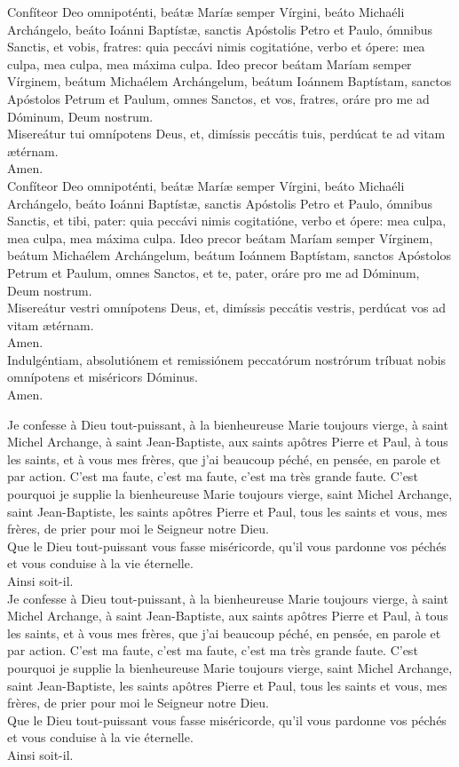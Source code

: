 \documentclass[twoside]{article}
\begin{document}
\begin{paracol}{2}
\vv Confíteor Deo omnipoténti, beátæ Maríæ semper Vírgini, beáto Michaéli Archángelo, beáto Ioánni Baptístæ, sanctis Apóstolis Petro et Paulo, ómnibus Sanctis, et vobis, fratres: quia peccávi nimis cogitatióne, verbo et ópere: mea culpa, mea culpa, mea máxima culpa. Ideo precor beátam Maríam semper Vírginem, beátum Michaélem Archángelum, beátum Ioánnem Baptístam, sanctos Apóstolos Petrum et Paulum, omnes Sanctos, et vos, fratres, oráre pro me ad Dóminum, Deum nostrum.\\
\rr Misereátur tui omnípotens Deus, et, dimíssis peccátis tuis, perdúcat te ad vitam ætérnam.\\
\vv Amen.\\
\rr Confíteor Deo omnipoténti, beátæ Maríæ semper Vírgini, beáto Michaéli Archángelo, beáto Ioánni Baptístæ, sanctis Apóstolis Petro et Paulo, ómnibus Sanctis, et tibi, pater: quia peccávi nimis cogitatióne, verbo et ópere: mea culpa, mea culpa, mea máxima culpa. Ideo precor beátam Maríam semper Vírginem, beátum Michaélem Archángelum, beátum Ioánnem Baptístam, sanctos Apóstolos Petrum et Paulum, omnes Sanctos, et te, pater, oráre pro me ad Dóminum, Deum nostrum.\\
\vv Misereátur vestri omnípotens Deus, et, dimíssis peccátis vestris, perdúcat vos ad vitam ætérnam.\\
\rr Amen.\\
\vv Indulgéntiam, \cc absolutiónem et remissiónem peccatórum nostrórum tríbuat nobis omnípotens et miséricors Dóminus.\\
\rr Amen.

\switchcolumn

\vv Je confesse à Dieu tout-puissant, à la bienheureuse Marie toujours vierge, à saint Michel Archange, à saint Jean-Baptiste, aux saints apôtres Pierre et Paul, à tous les saints, et à vous mes frères, que j’ai beaucoup péché, en pensée, en parole et par action. C’est ma faute, c’est ma faute, c’est ma très grande faute. C’est pourquoi je supplie la bienheureuse Marie toujours vierge, saint Michel Archange, saint Jean-Baptiste, les saints apôtres Pierre et Paul, tous les saints et vous, mes frères, de prier pour moi le Seigneur notre Dieu. \\
\rr Que le Dieu tout-puissant vous fasse miséricorde, qu’il vous pardonne vos péchés et vous conduise à la vie éternelle. \\
\vv Ainsi soit-il. \\
\rr Je confesse à Dieu tout-puissant, à la bienheureuse Marie toujours vierge, à saint Michel Archange, à saint Jean-Baptiste, aux saints apôtres Pierre et Paul, à tous les saints, et à vous mes frères, que j’ai beaucoup péché, en pensée, en parole et par action.
C’est ma faute, c’est ma faute, c’est ma très grande faute. C’est pourquoi je supplie la bienheureuse Marie toujours vierge, saint Michel Archange, saint Jean-Baptiste, les saints apôtres Pierre et Paul, tous les saints et vous, mes frères, de prier pour moi le Seigneur notre Dieu. \\
\vv Que le Dieu tout-puissant vous fasse miséricorde, qu’il vous pardonne vos péchés et vous conduise à la vie éternelle. \\
\rr Ainsi soit-il.

\end{paracol}
\end{document}

